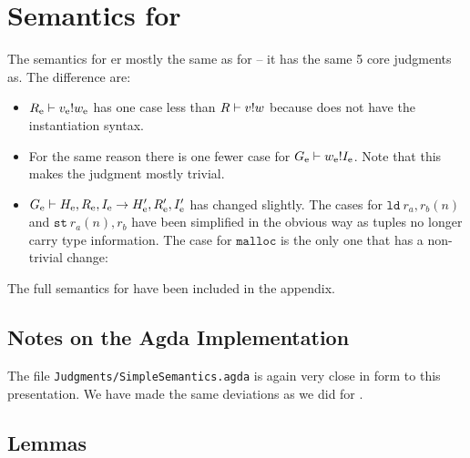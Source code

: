 \section{Semantics for \ATALe}

The semantics for \ATALe er mostly the same as for \ATAL -- it has the same 5
core judgments as. The difference are:

\begin{itemize}
\item ${R_{\mathrm{e}}} |- {v_{\mathrm{e}}} ! {w_{\mathrm{e}}}$ has one case less than
  ${R} |- {v} ! {w}$ because \ATALe does not have the
  instantiation syntax.
\item For the same reason there is one fewer case for
  ${G_{\mathrm{e}}} |- {w_{\mathrm{e}}} ! {I_{\mathrm{e}}}$. Note that this makes the
  judgment mostly trivial.
\item
  ${G_{\mathrm{e}}} |- {H_{\mathrm{e}}, R_{\mathrm{e}}, I_{\mathrm{e}}} -> {H_{\mathrm{e}}', R_{\mathrm{e}}',
    I_{\mathrm{e}}'}$ has changed slightly. The cases for $\mathtt{ld}\ r_a, r_b(n)$
  and $\mathtt{st}\ r_a(n), r_b$ have been simplified in the obvious way as
  tuples no longer carry type information. The case for $\mathtt{malloc}$ is the
  only one that has a non-trivial change:
\end{itemize}


The full semantics for \ATALe have been included in the appendix.

\subsection{Notes on the Agda Implementation}

The file \texttt{Judgments/SimpleSemantics.agda} is again very close in form to
this presentation. We have made the same deviations as we did for \ATAL.

\subsection{Lemmas}

